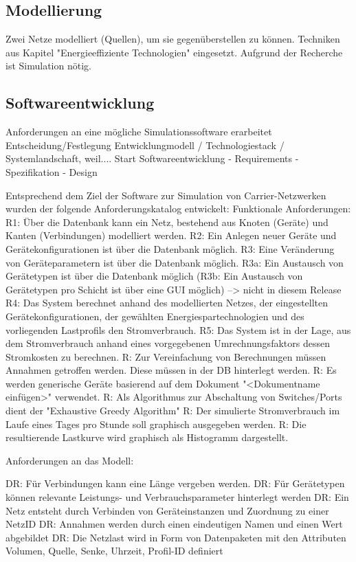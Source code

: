 \documentclass[12pt,titlepage]{article}
\begin{document}
\subsection{Modellierung}
Zwei Netze modelliert (Quellen), um sie gegenüberstellen zu können. Techniken aus Kapitel "Energieeffiziente Technologien" eingesetzt.
Aufgrund der Recherche ist Simulation nötig.

\subsection{Softwareentwicklung}

Anforderungen an eine mögliche Simulationssoftware erarbeitet
Entscheidung/Festlegung Entwicklungmodell / Technologiestack / Systemlandschaft, weil....
Start Softwareentwicklung
	- Requirements
	- Spezifikation
	- Design

Entsprechend dem Ziel der Software zur Simulation von Carrier-Netzwerken wurden der folgende Anforderungskatalog entwickelt:
Funktionale Anforderungen:
R1: Über die Datenbank kann ein Netz, bestehend aus Knoten (Geräte) und Kanten (Verbindungen) modelliert werden.
R2: Ein Anlegen neuer Geräte und Gerätekonfigurationen ist über die Datenbank möglich.
R3: Eine Veränderung von Geräteparametern ist über die Datenbank möglich.
R3a: Ein Austausch von Gerätetypen ist über die Datenbank möglich
(R3b: Ein Austausch von Gerätetypen pro Schicht ist über eine GUI möglich) --> nicht in diesem Release
R4: Das System berechnet anhand des modellierten Netzes, der eingestellten Gerätekonfigurationen, der gewählten Energiespartechnologien und des vorliegenden Lastprofils den Stromverbrauch.
R5: Das System ist in der Lage, aus dem Stromverbrauch anhand eines vorgegebenen Umrechnungsfaktors dessen Stromkosten zu berechnen.
R: Zur Vereinfachung von Berechnungen müssen Annahmen getroffen werden. Diese müssen in der DB hinterlegt werden.
R: Es werden generische Geräte basierend auf dem Dokument "<Dokumentname einfügen>" verwendet.
R: Als Algorithmus zur Abschaltung von Switches/Ports dient der "Exhaustive Greedy Algorithm"
R: Der simulierte Stromverbrauch im Laufe eines Tages pro Stunde soll graphisch ausgegeben werden.
R: Die resultierende Lastkurve wird graphisch als Histogramm dargestellt.

Anforderungen an das Modell:

DR: Für Verbindungen kann eine Länge vergeben werden.
DR: Für Gerätetypen können relevante Leistungs- und Verbrauchsparameter hinterlegt werden
DR: Ein Netz entsteht durch Verbinden von Geräteinstanzen und Zuordnung zu einer NetzID
DR: Annahmen werden durch einen eindeutigen Namen und einen Wert abgebildet
DR: Die Netzlast wird in Form von Datenpaketen mit den Attributen Volumen, Quelle, Senke, Uhrzeit, Profil-ID definiert
\end{document}
